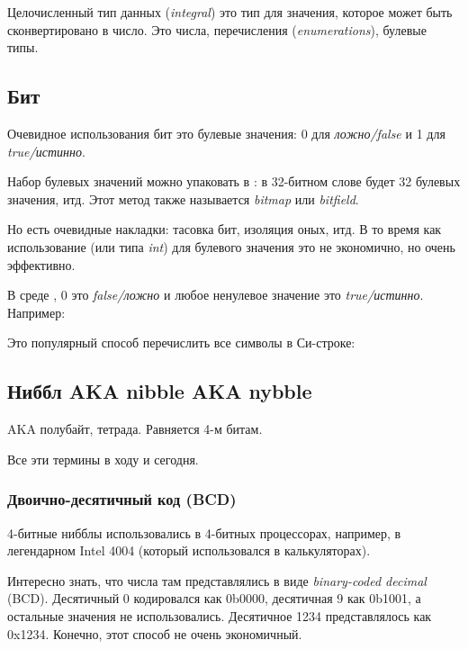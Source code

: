 
Целочисленный тип данных (\emph{integral}) это тип для значения, которое может быть сконвертировано в число.
Это числа, перечисления (\emph{enumerations}), булевые типы.

\subsection{Бит}

Очевидное использования бит это булевые значения: 0 для \emph{ложно/false} и 1 для \emph{true/истинно}.

Набор булевых значений можно упаковать в : в 32-битном слове будет 32 булевых значения, итд.
Этот метод также называется \emph{bitmap} или \emph{bitfield}.

Но есть очевидные накладки: тасовка бит, изоляция оных, итд.
В то время как использование  (или типа \emph{int}) для булевого значения это не экономично,
но очень эффективно.

В среде \CCpp, 0 это \emph{false/ложно} и любое ненулевое значение это \emph{true/истинно}.
Например:



Это популярный способ перечислить все символы в Си-строке:



\subsection{Ниббл AKA nibble AKA nybble}

\ac{AKA} полубайт, тетрада.
Равняется 4-м битам.

Все эти термины в ходу и сегодня.

\subsubsection{Двоично-десятичный код (\ac{BCD})}
\label{BCD}


4-битные нибблы использовались в 4-битных процессорах, например, в легендарном Intel 4004 (который использовался в
калькуляторах).

Интересно знать, что числа там представлялись в виде \emph{binary-coded decimal} (\ac{BCD}).
Десятичный 0 кодировался как 0b0000, десятичная 9 как 0b1001, а остальные значения не использовались.
Десятичное 1234 представлялось как 0x1234.
Конечно, этот способ не очень экономичный.

